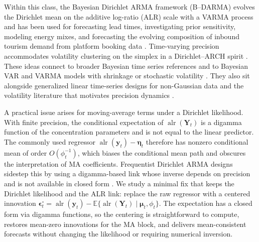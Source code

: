 \documentclass[12pt]{article}
\theoremstyle{remark}
\newcommand{\E}{\mathbb{E}}
\newcommand{\alr}{\operatorname{alr}}
\newcommand{\bfmu}{\boldsymbol{\mu}}
\newcommand{\bfeta}{\boldsymbol{\eta}}
\newcommand{\bfY}{\mathbf{Y}}
\newcommand{\bfy}{\mathbf{y}}
\begin{document}
Within this class, the Bayesian Dirichlet ARMA framework (B--DARMA) evolves the Dirichlet mean on the additive log-ratio (ALR) scale with a VARMA process and has been used for forecasting lead times, investigating prior sensitivity, modeling energy mixes, and forecasting the evolving composition of inbound tourism demand from platform booking data \citep{KATZ20241556, forecast7030032, forecast7040062, katz2026forecastingevolvingcompositioninbound}. Time-varying precision accommodates volatility clustering on the simplex in a Dirichlet--ARCH spirit \citep{KATZ20261033}. These ideas connect to broader Bayesian time series references \citep{prado2010time, west1996bayesian} and to Bayesian VAR and VARMA models with shrinkage or stochastic volatility \citep{banbura2010large, karlsson2013forecasting, huber2019adaptive, kastner2020sparse}. They also sit alongside generalized linear time-series designs for non-Gaussian data \citep{brandt2012bayesian, roberts2002variational, chen2016generalized, mccabe2005bayesian, berry2020bayesian, fukumoto2019bayesian, silveira2015bayesian} and the volatility literature that motivates precision dynamics \citep{engle1982autoregressive, bollerslev1986generalized, nelson1991conditional, bauwens2006multivariate, engle2001theoretical, francq2019garch, silvennoinen2009multivariate, tsay2005analysis}.

A practical issue arises for moving-average terms under a Dirichlet likelihood. With finite precision, the conditional expectation of $\alr(\bfY_t)$ is a digamma function of the concentration parameters and is not equal to the linear predictor. The commonly used regressor $\alr(\bfy_t)-\bfeta_t$ therefore has nonzero conditional mean of order $O(\phi_t^{-1})$, which biases the conditional mean path and obscures the interpretation of MA coefficients. Frequentist Dirichlet ARMA designs sidestep this by using a digamma-based link whose inverse depends on precision and is not available in closed form \citep{zheng2017dirichlet}. We study a minimal fix that keeps the Dirichlet likelihood and the ALR link: replace the raw regressor with a centered innovation $\boldsymbol{\epsilon}_t^{\circ}=\alr(\bfy_t)-\E\{\alr(\bfY_t)\mid \bfmu_t,\phi_t\}$. The expectation has a closed form via digamma functions, so the centering is straightforward to compute, restores mean-zero innovations for the MA block, and delivers mean-consistent forecasts without changing the likelihood or requiring numerical inversion.
\end{document}

